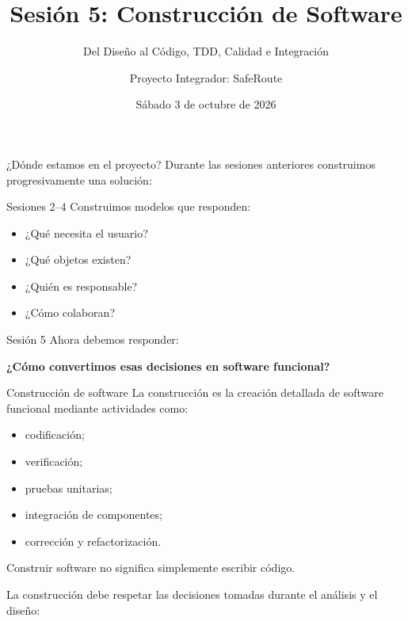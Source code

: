 \documentclass[11pt,aspectratio=169]{beamer}
\title{Sesión 5: Construcción de Software}
\subtitle{Del Diseño al Código, TDD, Calidad e Integración}
\author{Proyecto Integrador: SafeRoute}
\date{Sábado 3 de octubre de 2026}
\begin{document}
\begin{frame}\titlepage\end{frame}

\begin{frame}{¿Dónde estamos en el proyecto?}
Durante las sesiones anteriores construimos progresivamente una solución:


\begin{twocol}[split=0.5]
  \begin{block}{Sesiones 2--4}
    Construimos modelos que responden:
    \begin{itemize}
      \item ¿Qué necesita el usuario?
      \item ¿Qué objetos existen?
      \item ¿Quién es responsable?
      \item ¿Cómo colaboran?
    \end{itemize}
  \end{block}
\nextcol
  \begin{block}{Sesión 5}
    Ahora debemos responder:
    \begin{center}\Large
      \textbf{¿Cómo convertimos esas decisiones en software funcional?}
    \end{center}
  \end{block}
\end{twocol}
\end{frame}

\begin{frame}{Construcción de software}
La construcción es la creación detallada de software funcional mediante
actividades como:
\begin{itemize}
  \item codificación;
  \item verificación;
  \item pruebas unitarias;
  \item integración de componentes;
  \item corrección y refactorización.
\end{itemize}

\begin{statement}
  Construir software no significa simplemente escribir código.
\end{statement}

La construcción debe respetar las decisiones tomadas durante el análisis y el diseño:

\begin{center}
\end{center}
\end{frame}
\end{document}
